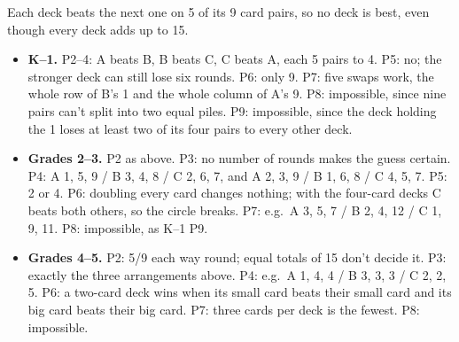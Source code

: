 \documentclass[11pt]{article}
\newcommand{\sect}[1]{\par\medskip{\large\bfseries #1}\par\smallskip}
\begin{document}
\sect{The surprise}
Each deck beats the next one on 5 of its 9 card pairs, so no deck is best, even though every deck adds up to 15.

\sect{Key answers}
\begin{itemize}
\item \textbf{K--1.} P2--4: A beats B, B beats C, C beats A, each 5 pairs to 4. P5: no; the stronger deck can still lose six rounds. P6: only 9. P7: five swaps work, the whole row of B's 1 and the whole column of A's 9. P8: impossible, since nine pairs can't split into two equal piles. P9: impossible, since the deck holding the 1 loses at least two of its four pairs to every other deck.
\item \textbf{Grades 2--3.} P2 as above. P3: no number of rounds makes the guess certain. P4: A 1, 5, 9 / B 3, 4, 8 / C 2, 6, 7, and A 2, 3, 9 / B 1, 6, 8 / C 4, 5, 7. P5: 2 or 4. P6: doubling every card changes nothing; with the four-card decks C beats both others, so the circle breaks. P7: e.g.\ A 3, 5, 7 / B 2, 4, 12 / C 1, 9, 11. P8: impossible, as K--1 P9.
\item \textbf{Grades 4--5.} P2: 5/9 each way round; equal totals of 15 don't decide it. P3: exactly the three arrangements above. P4: e.g.\ A 1, 4, 4 / B 3, 3, 3 / C 2, 2, 5. P6: a two-card deck wins when its small card beats their small card and its big card beats their big card. P7: three cards per deck is the fewest. P8: impossible.
\end{itemize}
\end{document}
